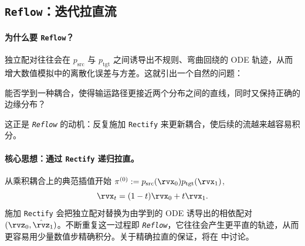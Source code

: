\subsection{\texttt{Reflow}：迭代拉直流}\label{subsec:reflow-def}

\paragraph{为什么要 \texttt{Reflow}？}
独立配对往往会在 $p_{\text{src}}$ 与 $p_{\text{tgt}}$ 之间诱导出不规则、弯曲回绕的 ODE 轨迹，从而增大数值模拟中的离散化误差与方差。这就引出一个自然的问题：

\begin{question}\label{ques:straight}
能否学到一种耦合，使得输运路径更接近两个分布之间的直线，同时又保持正确的边缘分布？
\end{question}

这正是 \emph{\texttt{Reflow}} 的动机：反复施加 \texttt{Rectify} 来更新耦合，使后续的流越来越容易积分。

\paragraph{核心思想：通过 \texttt{Rectify} 递归拉直。}

从乘积耦合上的典范插值开始
$\pi^{(0)}:=p_{\text{src}}(\rvx_0)p_{\text{tgt}}(\rvx_1)$,
\[
\rvx_t=(1-t)\rvx_0+t\rvx_1.
\]
施加 \texttt{Rectify} 会把独立配对替换为由学到的 ODE 诱导出的相依配对 $(\rvz_0,\hat\rvz_1)$。不断重复这一过程即 \emph{\texttt{Reflow}}，它往往会产生更平直的轨迹，从而更容易用少量数值步精确积分。关于精确拉直的保证，将在  中讨论。

